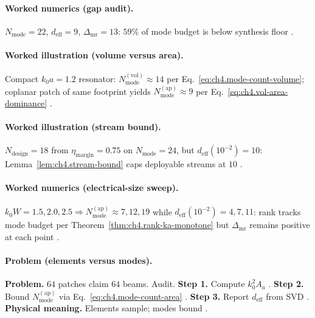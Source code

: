 \paragraph{Worked numerics (gap audit).}
\(N_{\mathrm{mode}}=22\), \(d_{\mathrm{eff}}=9\), \(\Delta_{\mathrm{mr}}=13\): \(59\%\) of mode budget is below synthesis floor \cite{hansen1988,harrington2001,devaney2004}.

\paragraph{Worked illustration (volume versus area).}
Compact \(k_{0}a=1.2\) resonator: \(N_{\mathrm{mode}}^{\mathrm{(vol)}}\approx14\) per Eq.~\eqref{eq:ch4.mode-count-volume}; coplanar patch of same
footprint yields \(N_{\mathrm{mode}}^{\mathrm{(ap)}}\approx9\) per Eq.~\eqref{eq:ch4.vol-area-dominance} \cite{collin2001,jackson1999,hansen1988,harrington2001}.

\paragraph{Worked illustration (stream bound).}
\(N_{\mathrm{design}}=18\) from \(\eta_{\mathrm{margin}}=0.75\) on \(N_{\mathrm{mode}}=24\), but \(d_{\mathrm{eff}}(10^{-2})=10\): Lemma~\ref{lem:ch4.stream-bound}
caps deployable streams at \(10\) \cite{harrington2001,devaney2004,collin2001,stratton1941}.

\paragraph{Worked numerics (electrical-size sweep).}
\(k_{0}W=1.5,2.0,2.5\Rightarrow N_{\mathrm{mode}}^{\mathrm{(ap)}}\approx7,12,19\) while \(d_{\mathrm{eff}}(10^{-2})=4,7,11\): rank tracks mode budget per
Theorem~\ref{thm:ch4.rank-ka-monotone} but \(\Delta_{\mathrm{mr}}\) remains positive at each point \cite{hansen1988,harrington2001,devaney2004,collin2001}.

\paragraph{Problem (elements versus modes).}
\textbf{Problem.} \(64\) patches claim \(64\) beams. Audit.
\textbf{Step 1.} Compute \(k_{0}^{2}A_{a}\) \cite{jackson1999,stratton1941}.
\textbf{Step 2.} Bound \(N_{\mathrm{mode}}^{\mathrm{(ap)}}\) via Eq.~\eqref{eq:ch4.mode-count-area} \cite{hansen1988,harrington2001}.
\textbf{Step 3.} Report \(d_{\mathrm{eff}}\) from SVD \cite{devaney2004}.
\textbf{Physical meaning.} Elements sample; modes bound \cite{collin2001}.

